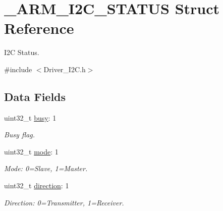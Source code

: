 \hypertarget{struct___a_r_m___i2_c___s_t_a_t_u_s}{}\section{\+\_\+\+A\+R\+M\+\_\+\+I2\+C\+\_\+\+S\+T\+A\+T\+US Struct Reference}
\label{struct___a_r_m___i2_c___s_t_a_t_u_s}


I2C Status.  




{\ttfamily \#include $<$Driver\+\_\+\+I2\+C.\+h$>$}

\subsection*{Data Fields}
\begin{DoxyCompactItemize}
\item 
\mbox{\label{struct___a_r_m___i2_c___s_t_a_t_u_s_a50c88f3c1d787773e2ac1b59533f034a}} 
uint32\+\_\+t \mbox{\hyperlink{struct___a_r_m___i2_c___s_t_a_t_u_s_a50c88f3c1d787773e2ac1b59533f034a}{busy}}\+: 1
\begin{DoxyCompactList}\small\item\em Busy flag. \end{DoxyCompactList}\item 
\mbox{\label{struct___a_r_m___i2_c___s_t_a_t_u_s_a6b29e4f37f4482274af785ad5ffe96a7}} 
uint32\+\_\+t \mbox{\hyperlink{struct___a_r_m___i2_c___s_t_a_t_u_s_a6b29e4f37f4482274af785ad5ffe96a7}{mode}}\+: 1
\begin{DoxyCompactList}\small\item\em Mode\+: 0=Slave, 1=Master. \end{DoxyCompactList}\item 
\mbox{\label{struct___a_r_m___i2_c___s_t_a_t_u_s_a2148ffb99828aeaced6a5655502434ac}} 
uint32\+\_\+t \mbox{\hyperlink{struct___a_r_m___i2_c___s_t_a_t_u_s_a2148ffb99828aeaced6a5655502434ac}{direction}}\+: 1
\begin{DoxyCompactList}\small\item\em Direction\+: 0=Transmitter, 1=Receiver. \end{DoxyCompactList}\item 
\mbox{\label{struct___a_r_m___i2_c___s_t_a_t_u_s_ab65804439f6f5beda8da30381b0ad22d}} 

\end{DoxyCompactItemize}
